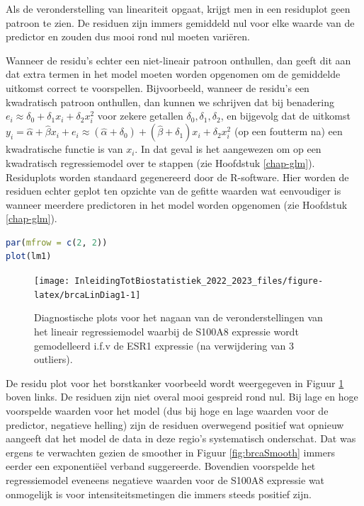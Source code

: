 \documentclass[
  12pt,dutch,coursenotes]{book}
\begin{document}
Als de veronderstelling van lineariteit opgaat, krijgt men in een residuplot geen patroon te zien.
De residuen zijn immers gemiddeld nul voor elke waarde van de predictor en zouden dus mooi rond nul moeten variëren.

Wanneer de residu's echter een niet-lineair patroon onthullen, dan geeft dit aan dat extra termen in het model moeten worden opgenomen om de
gemiddelde uitkomst correct te voorspellen. Bijvoorbeeld, wanneer de residu's een kwadratisch patroon onthullen, dan kunnen we schrijven dat bij benadering \(e_i\approx \delta_0+\delta_1 x_i+\delta_2 x_i^2\) voor zekere getallen \(\delta_0,\delta_1,\delta_2\), en bijgevolg
dat de uitkomst \(y_i=\hat{\alpha}+\hat{\beta}x_i+e_i\approx (\hat{\alpha}+\delta_0)+(\hat{\beta}+\delta_1)x_i+\delta_2 x_i^2\) (op een foutterm na) een kwadratische functie is van \(x_i\). In dat geval is het aangewezen om op een kwadratisch regressiemodel over te stappen (zie Hoofdstuk \ref{chap-glm}).
Residuplots worden standaard gegenereerd door de R-software. Hier worden de residuen echter geplot ten opzichte van de gefitte waarden wat eenvoudiger is wanneer meerdere predictoren in het model worden opgenomen (zie Hoofdstuk \ref{chap-glm}).

\begin{lstlisting}[language=R]
par(mfrow = c(2, 2))
plot(lm1)
\end{lstlisting}

\begin{figure}

{\centering \texttt{[image: InleidingTotBiostatistiek\_2022\_2023\_files/figure-latex/brcaLinDiag1-1]} 

}

\caption{Diagnostische plots voor het nagaan van de veronderstellingen van het lineair regressiemodel waarbij de S100A8 expressie wordt gemodelleerd i.f.v de ESR1 expressie (na verwijdering van 3 outliers).}\label{fig:brcaLinDiag1}
\end{figure}

De residu plot voor het borstkanker voorbeeld wordt weergegeven in Figuur \ref{fig:brcaLinDiag1} boven links.
De residuen zijn niet overal mooi gespreid rond nul.
Bij lage en hoge voorspelde waarden voor het model (dus bij hoge en lage waarden voor de predictor, negatieve helling) zijn de residuen overwegend positief wat opnieuw aangeeft dat het model de data in deze regio's systematisch onderschat.
Dat was ergens te verwachten gezien de smoother in Figuur \ref{fig:brcaSmooth} immers eerder een exponentiëel verband suggereerde.
Bovendien voorspelde het regressiemodel eveneens negatieve waarden voor de S100A8 expressie wat onmogelijk is voor intensiteitsmetingen die immers steeds positief zijn.
\end{document}
